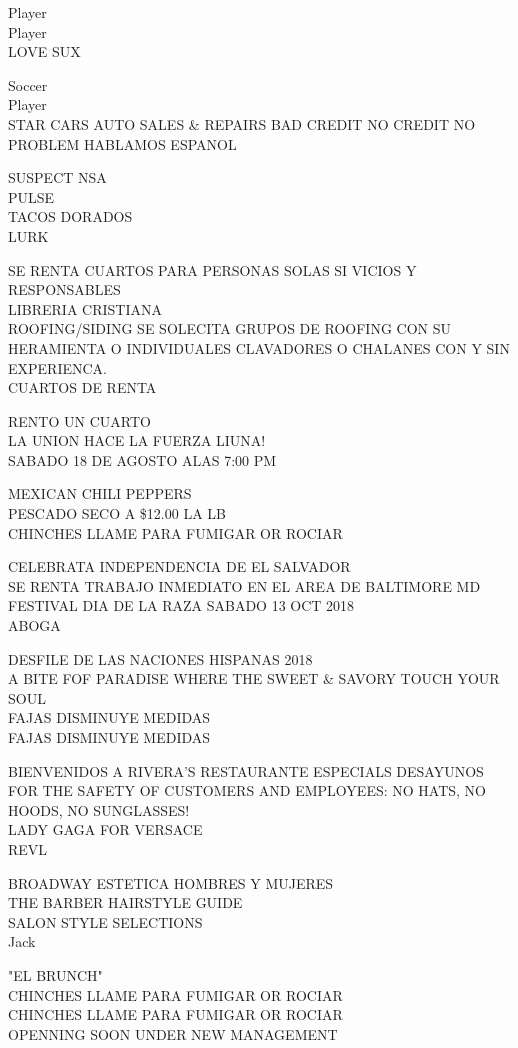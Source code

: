 \documentclass[10pt,letterpaper]{article}
\begin{document}
Player\\
Player\\
LOVE SUX

Soccer\\
Player\\
STAR CARS AUTO SALES \& REPAIRS BAD CREDIT NO CREDIT NO PROBLEM HABLAMOS ESPANOL

SUSPECT NSA\\
PULSE\\
TACOS DORADOS\\
LURK

SE RENTA CUARTOS PARA PERSONAS SOLAS SI VICIOS Y RESPONSABLES\\
LIBRERIA CRISTIANA\\
ROOFING/SIDING SE SOLECITA GRUPOS DE ROOFING CON SU HERAMIENTA O INDIVIDUALES CLAVADORES O CHALANES CON Y SIN EXPERIENCA.\\
CUARTOS DE RENTA

RENTO UN CUARTO\\
LA UNION HACE LA FUERZA LIUNA!\\
SABADO 18 DE AGOSTO ALAS 7:00 PM

MEXICAN CHILI PEPPERS\\
PESCADO SECO A \$12.00 LA LB\\
CHINCHES LLAME PARA FUMIGAR OR ROCIAR

CELEBRATA INDEPENDENCIA DE EL SALVADOR\\
SE RENTA TRABAJO INMEDIATO EN EL AREA DE BALTIMORE MD\\
FESTIVAL DIA DE LA RAZA SABADO 13 OCT 2018\\
ABOGA

DESFILE DE LAS NACIONES HISPANAS 2018\\
A BITE FOF PARADISE WHERE THE SWEET \& SAVORY TOUCH YOUR SOUL\\
FAJAS DISMINUYE MEDIDAS\\
FAJAS DISMINUYE MEDIDAS

BIENVENIDOS A RIVERA'S RESTAURANTE ESPECIALS DESAYUNOS\\
FOR THE SAFETY OF CUSTOMERS AND EMPLOYEES: NO HATS, NO HOODS, NO SUNGLASSES!\\
LADY GAGA FOR VERSACE\\
REVL

BROADWAY ESTETICA HOMBRES Y MUJERES\\
THE BARBER HAIRSTYLE GUIDE\\
SALON STYLE SELECTIONS\\
Jack

"EL BRUNCH"\\
CHINCHES LLAME PARA FUMIGAR OR ROCIAR\\
CHINCHES LLAME PARA FUMIGAR OR ROCIAR\\
OPENNING SOON UNDER NEW MANAGEMENT
\end{document}
